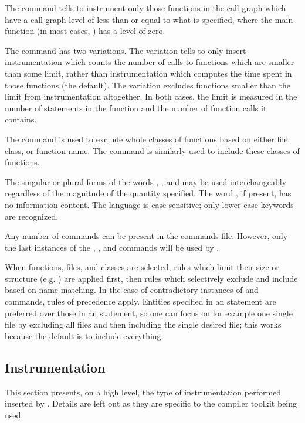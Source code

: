 The  command tells  to instrument only those
functions in the call graph which have a call graph level of less than
or equal to what is specified, where the main function (in most cases,
) has a level of zero.

The  command has two variations. The 
variation tells  to only insert instrumentation which counts
the number of calls to functions which are smaller than some limit,
rather than instrumentation which computes the time spent in those
functions (the default). The  variation excludes functions
smaller than the limit from instrumentation altogether.  In both cases,
the limit is measured in the number of statements in the function and
the number of function calls it contains.

The  command is used to exclude whole classes of functions
based on either file, class, or function name. The  command
is similarly used to include these classes of functions.

The singular or plural forms of the words , ,
and  may be used interchangeably regardless of the
magnitude of the quantity specified. The word , if present,
has no information content. The language is case-sensitive; only
lower-case keywords are recognized.

Any number of commands can be present in the commands file. However,
only the last instances of the , , and
 commands will be used by . 

When functions, files, and classes are selected, rules which limit their
size or structure (e.g. ) are applied first, then
rules which selectively exclude and include based on name matching.  In
the case of contradictory instances of  and
 commands, rules of precedence apply. Entities specified
in an  statement are preferred over those in an
 statement, so one can focus on for example one single
file by excluding all files and then including the single desired file;
this works because the default is to include everything.

\subsection{Instrumentation}

This section presents, on a high level, the type of instrumentation
performed inserted by . Details are left out as they are
specific to the compiler toolkit being used.

